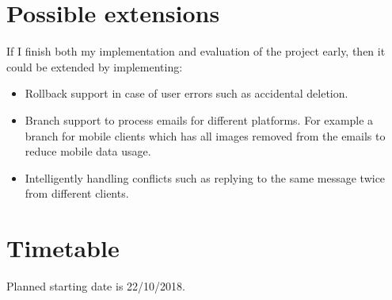 \documentclass[12pt,a4paper,twoside]{article}
\begin{document}
\section*{Possible extensions}

If I finish both my implementation and evaluation of the project early, then it could be extended by implementing:

\begin{itemize}

    \item Rollback support in case of user errors such as accidental deletion.

    \item Branch support to process emails for different platforms. For example a branch for mobile clients which has all images removed from the emails to reduce mobile data usage.

    \item Intelligently handling conflicts such as replying to the same message twice from different clients.

\end{itemize}

\section*{Timetable}

Planned starting date is 22/10/2018.
\end{document}
